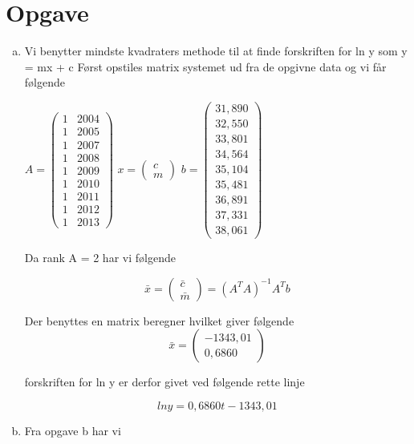 \documentclass[12pt]{article}
\begin{document}
\section{Opgave}
\begin{enumerate}[(a)]
\item
Vi benytter mindste kvadraters methode til at finde forskriften for ln y som y =
mx + c
Først opstiles matrix systemet ud fra de opgivne data og vi får følgende

$
A = \left(\begin{array}{cc}
1&2004\\
1&2005\\
1&2007\\
1&2008\\
1&2009\\
1&2010\\
1&2011\\
1&2012\\
1&2013
\end{array}\right)$
$x = \left(\begin{array}{c}
c\\m
\end{array}\right)
$
$b = \left(\begin{array}{c}
31,890\\
32,550\\
33,801\\
34,564\\
35,104\\
35,481\\
36,891\\
37,331\\
38,061
\end{array}\right)
$

Da rank A = 2 har vi følgende

$$
\bar{x}= \left(\begin{array}{c}
\bar{c}\\
\bar{m}
\end{array}\right)=
\left(A^TA\right)^{-1}A^Tb
$$

Der benyttes en matrix beregner hvilket giver følgende
$$
\bar{x}= \left(\begin{array}{c}
-1343,01\\
0,6860
\end{array}\right)
$$

forskriften for ln y er derfor givet ved følgende rette linje

$$
ln y=0,6860t-1343,01
$$
\item
Fra opgave b har vi


\end{enumerate}
\end{document}
